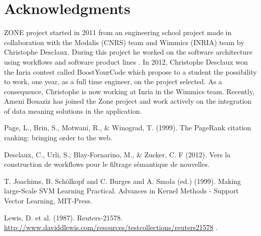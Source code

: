 \documentclass{llncs}
\begin{document}
\section{Acknowledgments}
%
ZONE project started in 2011 from an engineering school project made in collaboration with the Modalis (CNRS) team and Wimmics (INRIA) team by Christophe Desclaux. During this project he worked on the software architecture using workflows and software product lines \cite{desclaux:urli}. In 2012, Christophe Desclaux won the Inria contest called BoostYourCode which propose to a student the possibility to work, one year, as a full time engineer, on the project selected. As a consequence, Christophe is now working at Inria in the Wimmics team.  Recently, Ameni Bouaziz has joined the Zone project and work actively on the integration of data meaning solutions in the application.
%
%
\begin{thebibliography}{5}
%
Page, L., Brin, S., Motwani, R., \& Winograd, T. (1999). The PageRank citation ranking: bringing order to the web.

Desclaux, C., Urli, S., Blay-Fornarino, M., \& Zucker, C. F (2012). Vers la construction de workflows pour le filtrage sémantique de nouvelles.

T. Joachims, B. Schölkopf and C. Burges and A. Smola (ed.) (1999). Making large-Scale SVM Learning Practical. Advances in Kernel Methods - Support Vector Learning, MIT-Press. 

Lewis, D. et al. (1987). Reuters-21578.
\url{http://www.daviddlewis.com/resources/testcollections/reuters21578}
.
\end{thebibliography}

\clearpage
\end{document}
